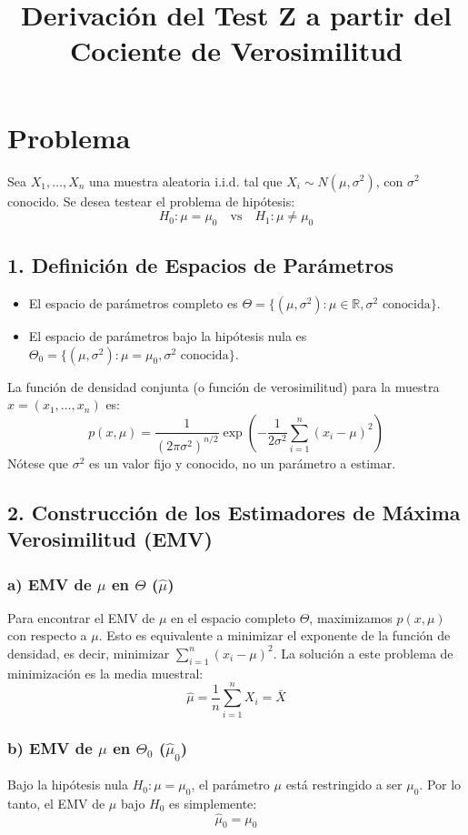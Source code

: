 \documentclass{article}
\title{Derivación del Test Z a partir del Cociente de Verosimilitud}
\author{}
\date{}
\begin{document}
\maketitle

\section*{Problema}
Sea $X_1, \dots, X_n$ una muestra aleatoria i.i.d. tal que $X_i \sim N(\mu, \sigma^2)$, con $\sigma^2$ conocido.
Se desea testear el problema de hipótesis:
$$ H_0: \mu = \mu_0 \quad \text{vs} \quad H_1: \mu \ne \mu_0 $$

\subsection*{1. Definición de Espacios de Parámetros}
\begin{itemize}
    \item El espacio de parámetros completo es $\Theta = \{(\mu, \sigma^2): \mu \in \mathbb{R}, \sigma^2 \text{ conocida}\}$.
    \item El espacio de parámetros bajo la hipótesis nula es $\Theta_0 = \{(\mu, \sigma^2): \mu=\mu_0, \sigma^2 \text{ conocida}\}$.
\end{itemize}
La función de densidad conjunta (o función de verosimilitud) para la muestra $x = (x_1, \dots, x_n)$ es:
$$ p(x, \mu) = \frac{1}{(2\pi\sigma^2)^{n/2}} \exp\left(-\frac{1}{2\sigma^2} \sum_{i=1}^n (x_i - \mu)^2\right) $$
Nótese que $\sigma^2$ es un valor fijo y conocido, no un parámetro a estimar.

\subsection*{2. Construcción de los Estimadores de Máxima Verosimilitud (EMV)}

\subsubsection*{a) EMV de $\mu$ en $\Theta$ ($\hat{\mu}$)}
Para encontrar el EMV de $\mu$ en el espacio completo $\Theta$, maximizamos $p(x, \mu)$ con respecto a $\mu$. Esto es equivalente a minimizar el exponente de la función de densidad, es decir, minimizar $\sum_{i=1}^n (x_i - \mu)^2$.
La solución a este problema de minimización es la media muestral:
$$ \hat{\mu} = \frac{1}{n} \sum_{i=1}^n X_i = \bar{X} $$

\subsubsection*{b) EMV de $\mu$ en $\Theta_0$ ($\hat{\mu}_0$)}
Bajo la hipótesis nula $H_0: \mu = \mu_0$, el parámetro $\mu$ está restringido a ser $\mu_0$. Por lo tanto, el EMV de $\mu$ bajo $H_0$ es simplemente:
$$ \hat{\mu}_0 = \mu_0 $$
\end{document}

